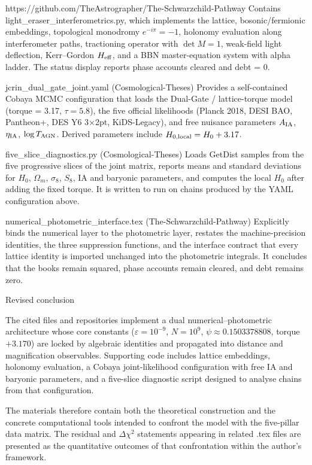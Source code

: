 https://github.com/TheAstrographer/The-Schwarzchild-Pathway  
Contains light_eraser_interferometrics.py, which implements the lattice, bosonic/fermionic embeddings, topological monodromy \(e^{-i\pi} = -1\), holonomy evaluation along interferometer paths, tractioning operator with \(\det M = 1\), weak-field light deflection, Kerr–Gordon \(H_{\rm eff}\), and a BBN master-equation system with alpha ladder. The status display reports phase accounts cleared and debt = 0.

jcrin_dual_gate_joint.yaml (Cosmological-Theses)  
Provides a self-contained Cobaya MCMC configuration that loads the Dual-Gate / lattice-torque model (torque = 3.17, \(\tau = 5.8\)), the five official likelihoods (Planck 2018, DESI BAO, Pantheon+, DES Y6 3×2pt, KiDS-Legacy), and free nuisance parameters \(A_{\rm IA}\), \(\eta_{\rm IA}\), \(\log T_{\rm AGN}\). Derived parameters include \(H_{0,\rm local} = H_0 + 3.17\).

five_slice_diagnostics.py (Cosmological-Theses)  
Loads GetDist samples from the five progressive slices of the joint matrix, reports means and standard deviations for \(H_0\), \(\Omega_m\), \(\sigma_8\), \(S_8\), IA and baryonic parameters, and computes the local \(H_0\) after adding the fixed torque. It is written to run on chains produced by the YAML configuration above.

numerical_photometric_interface.tex (The-Schwarzchild-Pathway)  
Explicitly binds the numerical layer to the photometric layer, restates the machine-precision identities, the three suppression functions, and the interface contract that every lattice identity is imported unchanged into the photometric integrals. It concludes that the books remain squared, phase accounts remain cleared, and debt remains zero.

Revised conclusion

The cited files and repositories implement a dual numerical–photometric architecture whose core constants (\(\varepsilon = 10^{-9}\), \(N = 10^9\), \(\psi \approx 0.1503378808\), torque \(+3.170\)) are locked by algebraic identities and propagated into distance and magnification observables. Supporting code includes lattice embeddings, holonomy evaluation, a Cobaya joint-likelihood configuration with free IA and baryonic parameters, and a five-slice diagnostic script designed to analyse chains from that configuration.  

The materials therefore contain both the theoretical construction and the concrete computational tools intended to confront the model with the five-pillar data matrix. The residual and \(\Delta\chi^2\) statements appearing in related .tex files are presented as the quantitative outcomes of that confrontation within the author’s framework.  

